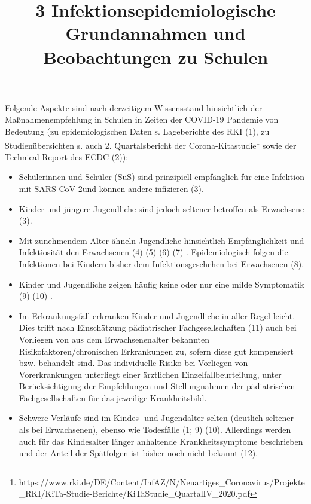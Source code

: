 \documentclass{article}
\begin{document}
\title{ 3 Infektionsepidemiologische Grundannahmen und Beobachtungen zu Schulen}

\maketitle


Folgende Aspekte sind nach derzeitigem Wissensstand hinsichtlich der Maßnahmenempfehlung in Schulen in Zeiten der COVID-19 Pandemie von Bedeutung (zu epidemiologischen Daten s. Lageberichte des RKI (1), zu Studienübersichten s. auch 2. Quartalsbericht der Corona-Kitastudie\footnote{https://www.rki.de/DE/Content/InfAZ/N/Neuartiges\_Coronavirus/Projekte\_RKI/KiTa-Studie-Berichte/KiTaStudie\_QuartalIV\_2020.pdf} sowie der Technical Report des ECDC (2)):

\begin{itemize}
\item Schülerinnen und Schüler (SuS) sind prinzipiell empfänglich für eine Infektion mit SARS-CoV-2und können andere infizieren (3).


\item Kinder und jüngere Jugendliche sind jedoch seltener betroffen als Erwachsene (3).


\item Mit zunehmendem Alter ähneln Jugendliche hinsichtlich Empfänglichkeit und Infektiosität den Erwachsenen (4) (5) (6) (7) . Epidemiologisch folgen die Infektionen bei Kindern bisher dem Infektionsgeschehen bei Erwachsenen (8).


\item Kinder und Jugendliche zeigen häufig keine oder nur eine milde Symptomatik (9) (10) .


\item  Im Erkrankungsfall erkranken Kinder und Jugendliche in aller Regel leicht. Dies trifft nach Einschätzung pädiatrischer Fachgesellschaften (11) auch bei Vorliegen von aus dem Erwachsenenalter bekannten Risikofaktoren/chronischen Erkrankungen zu, sofern diese gut kompensiert bzw. behandelt sind. Das individuelle Risiko bei Vorliegen von Vorerkrankungen unterliegt einer ärztlichen Einzelfallbeurteilung, unter Berücksichtigung der Empfehlungen und Stellungnahmen der pädiatrischen Fachgesellschaften für das jeweilige Krankheitsbild.


\item Schwere Verläufe sind im Kindes- und Jugendalter selten (deutlich seltener als bei Erwachsenen), ebenso wie Todesfälle (1; 9) (10). Allerdings werden auch für das Kindesalter länger anhaltende Krankheitssymptome beschrieben und der Anteil der Spätfolgen ist bisher noch nicht bekannt (12).



\end{itemize}
\end{document}
